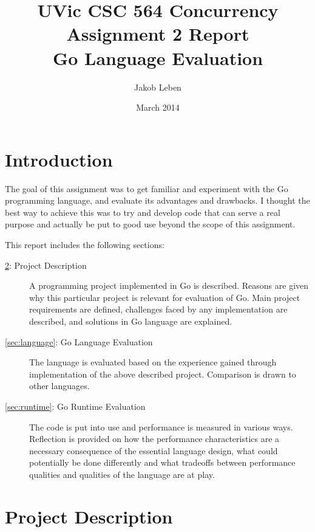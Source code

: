 \documentclass {article}
\begin{document}
\title{UVic CSC 564 Concurrency\\Assignment 2 Report\\Go Language Evaluation}
\author{Jakob Leben}
\date{March 2014}
\maketitle


\section{Introduction}

The goal of this assignment was to get familiar and experiment with the Go programming language, and evaluate its advantages and drawbacks. I thought the best way to achieve this was to try and develop code that can serve a real purpose and actually be put to good use beyond the scope of this assignment.

This report includes the following sections:

\begin{description}

\item[\ref{sec:project}: Project Description] A programming project implemented in Go is described. Reasons are given why this particular project is relevant for evaluation of Go. Main project requirements are defined, challenges faced by any implementation are described, and solutions in Go language are explained.

\item[\ref{sec:language}: Go Language Evaluation] The language is evaluated based on the experience gained through implementation of the above described project. Comparison is drawn to other languages.

\item[\ref{sec:runtime}: Go Runtime Evaluation] The code is put into use and performance is measured in various ways. Reflection is provided on how the performance characteristics are a necessary consequence of the essential language design, what could potentially be done differently and what tradeoffs between performance qualities and qualities of the language are at play.

\end{description}

\section{Project Description}
\label{sec:project}
\end{document}
